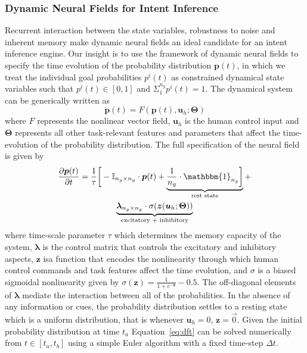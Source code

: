 \subsubsection{Dynamic Neural Fields for Intent Inference}\label{sssec:dft_ii}

Recurrent interaction between the state variables, 
robustness to noise and inherent memory make dynamic neural fields an ideal candidate for an intent inference engine. Our insight is to use the framework of dynamic neural fields to specify the time evolution of the probability distribution $\boldsymbol{p}(t)$, in which we treat the individual goal probabilities $p^i(t)$ as constrained dynamical state variables such that $p^i(t) \in [0, 1]$ and $\Sigma_{1}^{n_g}p^{i}(t) = 1$. The dynamical system can be generically written as 
\begin{equation}
\dot{\boldsymbol{p}}(t) = F(\boldsymbol{p}(t), \boldsymbol{u}_h ; \boldsymbol{\Theta})
\end{equation}
where $F$ represents the nonlinear vector field, $\boldsymbol{u}_h$ is the human control input and $\boldsymbol{\Theta}$ represents all other task-relevant features and parameters that affect the time-evolution of the probability distribution. 
The full specification of the neural field is given by
\begin{multline}\label{eq:dft}
\frac{\partial \boldsymbol{p}(t)}{\partial t} = \frac{1}{\tau}\bigg[-\mathbb{I}_{n_g\times n_g}\cdot\boldsymbol{p}(t) + \underbrace{\frac{1}{n_g}\cdot\mathbbm{1}_{n_g}\bigg]}_{\text{rest state}} + \\ \underbrace{\boldsymbol{\lambda}_{n_g\times n_g}\cdot\sigma(\boldsymbol{z}(\boldsymbol{u}_h;\boldsymbol{\Theta}))}_{\text{excitatory + inhibitory}}
\end{multline}
where time-scale parameter $\tau$ which determines the memory capacity of the system, $\boldsymbol{\lambda}$ is the control matrix that controls the excitatory and inhibitory aspects, $\boldsymbol{z}$ isa function that encodes the nonlinearity through which human control commands and task features affect the time evolution, and $\sigma$ is a biased sigmoidal nonlinearity given by $\sigma(\boldsymbol{z}) = \frac{1}{1 + e^{-\boldsymbol{z}}} - 0.5$.
The off-diagonal elements of $\boldsymbol{\lambda}$ mediate the interaction between all of the probabilities. In the absence of any information or cues, the probability distribution settles to a resting state which is a uniform distribution, that is whenever $\boldsymbol{u}_h = 0$, $\boldsymbol{z} = \vec{0}$. Given the initial probability distribution at time $t_a$ Equation~\ref{eq:dft} can be solved numerically from $t \in [t_a, t_b]$ using a simple Euler algorithm with a fixed time-step $\Delta t$.

